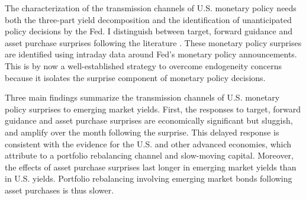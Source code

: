 {The characterization of the transmission channels of U.S. monetary policy needs both the three-part yield decomposition and the identification of unanticipated policy decisions by the Fed.
I distinguish between target, forward guidance and asset purchase surprises following the literature \citep{GSS:2005a,Swanson:2018}. 
These monetary policy surprises 
are identified using intraday data around Fed's monetary policy announcements. %
This is by now a well-established strategy %
to overcome endogeneity concerns because it isolates the surprise component of monetary policy decisions.

Three main findings summarize the transmission channels of U.S. monetary policy surprises to emerging market yields.
First, the responses to target, forward guidance and asset purchase surprises are economically significant but sluggish, and amplify over the month following the surprise. This delayed response is consistent with the evidence for the U.S. and other advanced economies, which \cite{BrooksKatzLustig:2019} attribute to a portfolio rebalancing channel and %
slow-moving capital. 
Moreover, the effects of %
asset purchase surprises last longer in emerging market yields than in U.S. yields. Portfolio rebalancing involving emerging market bonds following asset purchases is thus slower.

}
